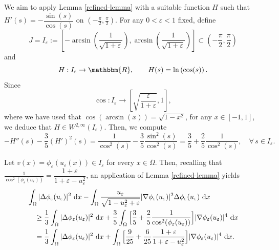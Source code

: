 \documentclass[11pt,  reqno]{amsart}%
\theoremstyle{plain}
\theoremstyle{definition}
\theoremstyle{remark}
\numberwithin{equation}{section}
\newcommand{\ve}{\varepsilon}
\newcommand{\dx}{\textup{d}x}
\begin{document}
We aim to apply Lemma \ref{refined-lemma} with a suitable function $H$ such that $H'(s)=- \dfrac{\sin (s)}{\cos(s)}$ on $\left(-\frac{\pi}{2}, \frac{\pi}{2}\right)$. 
For any $0<\varepsilon<1$ fixed, define
$$ 
J= I_\varepsilon :=\left[ -\arcsin \left(\frac{1}{\sqrt{1+\ve}} \right), \arcsin \left(\frac{1}{\sqrt{1+\ve}} \right) \right] \subset \left(-\frac{\pi}{2}, \frac{\pi}{2}\right)
$$
and 
$$
H: I_\varepsilon \to \mathbbm{R}, \qquad H(s)= \ln \left( \cos(s) \right).
$$
Since
$$
\cos: I_\varepsilon \to 
\left[ \sqrt{ \frac{\varepsilon}{1+\varepsilon}}, 1 \right],
$$
where we have used that $\cos (\arcsin (x))= \sqrt{1 - x^2}$, for any $x \in [-1,1]$, we deduce that $H \in W^{2,\infty}(I_\varepsilon)$.
Then, we compute 
\[
    -H''(s)-\frac{3}{5}(H')^2(s)
    =\frac{1}{\cos^2(s)}-\frac{3}{5}\frac{\sin^2(s)}{\cos^2(s)}
    =\frac{3}{5}+\frac{2}{5}\frac{1}{\cos^2(s)}, \quad \forall \, s \in I_\varepsilon.
    \]
    
Let $v(x)=\phi_\varepsilon(u_\varepsilon(x))\in I_\varepsilon$ for every $x\in\overline{\Omega}$.
Then, recalling that $\frac{1}{\cos^2(\phi_\ve(u_\ve))}=\dfrac{1+\varepsilon}{1+\varepsilon - u_\ve^2}$, an application of Lemma \ref{refined-lemma} yields
\begin{align*}
&\int_\Omega |\Delta \phi_\ve(u_\ve)|^2 \ \dx - \int_\Omega \dfrac{u_\ve}{\sqrt{1- u_\ve^2+\ve}}|\nabla \phi_\ve(u_\ve)|^2 \Delta \phi_\ve(u_\ve)\ \dx
\\
&
\quad 
\geq
    \frac13 \int_\Omega|\Delta \phi_\varepsilon(u_\varepsilon)|^2\ \dx
  +
    \frac35 \int_\Omega
   \Big[ \frac{3}{5}+\frac{2}{5}\frac{1}{\cos^2( \phi_\ve(u_\ve))}\Big]
    |\nabla  \phi_\ve(u_\ve)|^4\ \dx
 \\
 &  
\quad 
=
    \frac13 \int_\Omega|\Delta \phi_\varepsilon(u_\varepsilon)|^2\ \dx
  +
    \int_\Omega
   \Big[ \frac{9}{25}
+\frac{6}{25}
\frac{1+\varepsilon}
{1+\varepsilon-u_\varepsilon^2} \Big]
    |\nabla  \phi_\ve(u_\ve)|^4\ \dx.
\end{align*}
\end{document}
